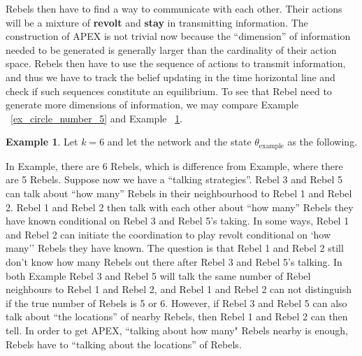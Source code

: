 \documentclass[12pt,letter]{article}
\theoremstyle{definition}
\newtheorem{example}{Example}[section]
\theoremstyle{remark}
\theoremstyle{claim}
\begin{document}
Rebels then have to find a way to communicate with each other. Their actions will be a mixture of \textbf{revolt} and \textbf{stay} in transmitting information. The construction of APEX is not trivial now because the ``dimension'' of information needed to be generated is generally larger than the cardinality of their action space. Rebels then have to use the sequence of actions to transmit information, and thus we have to track the belief updating in the time horizontal line and check if such sequences constitute an equilibrium. To see that Rebel need to generate more dimensions of information, we may compare Example ~\ref{ex_circle_number_5} and Example ~\ref{ex_circle_number_6}.
\begin{example}\label{ex_circle_number_6}
Let $k=6$ and let the network and the state $\theta_{\text{example}}$ as the following.
\begin{center} 
\end{center} 


\end{example}

In Example, there are 6 Rebels, which is difference from Example, where there are 5 Rebels. Suppose now we have a ``talking strategies''. Rebel 3 and Rebel 5 can talk about ``how many'' Rebels in their neighbourhood to Rebel 1 and Rebel 2. Rebel 1 and Rebel 2 then talk with each other about ``how many'' Rebels they have known conditional on Rebel 3 and Rebel 5's taking. In some ways, Rebel 1 and Rebel 2 can initiate the coordination to play revolt conditional on `how many'' Rebels they have known. The question is that Rebel 1 and Rebel 2 still don't know how many Rebels out there after Rebel 3 and Rebel 5's talking. In both Example Rebel 3 and Rebel 5 will talk the same number of Rebel neighbours to Rebel 1 and Rebel 2, and Rebel 1 and Rebel 2 can not distinguish if the true number of Rebels is 5 or 6. However, if Rebel 3 and Rebel 5 can also talk about ``the locations'' of nearby Rebels, then Rebel 1 and Rebel 2 can then tell. In order to get APEX, ``talking about how many" Rebels nearby is enough, Rebels have to ``talking about the locations'' of Rebels. 
\end{document}

